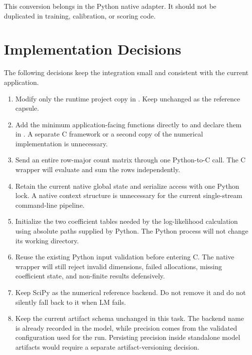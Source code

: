 \documentclass[11pt,a4paper]{article}
\begin{document}
This conversion belongs in the Python native adapter. It should not be
duplicated in training, calibration, or scoring code.

\section{Implementation Decisions}

The following decisions keep the integration small and consistent with the
current application.

\begin{enumerate}

\item Modify only the runtime project copy in
. Keep  unchanged as
the reference capsule.

\item Add the minimum application-facing functions directly to
 and declare them in . A separate C
framework or a second copy of the numerical implementation is unnecessary.

\item Send an entire row-major count matrix through one Python-to-C call. The
C wrapper will evaluate and sum the rows independently.

\item Retain the current native global state and serialize access with one
Python lock. A native context structure is unnecessary for the current
single-stream command-line pipeline.

\item Initialize the two coefficient tables needed by the log-likelihood
calculation using absolute paths supplied by Python. The Python process will
not change its working directory.

\item Reuse the existing Python input validation before entering C. The native
wrapper will still reject invalid dimensions, failed allocations, missing
coefficient state, and non-finite results defensively.

\item Keep SciPy as the numerical reference backend. Do not remove it and do
not silently fall back to it when LM fails.

\item Keep the current artifact schema unchanged in this task. The backend name
is already recorded in the model, while precision comes from the validated
configuration used for the run. Persisting precision inside standalone model
artifacts would require a separate artifact-versioning decision.

\end{enumerate}
\end{document}
